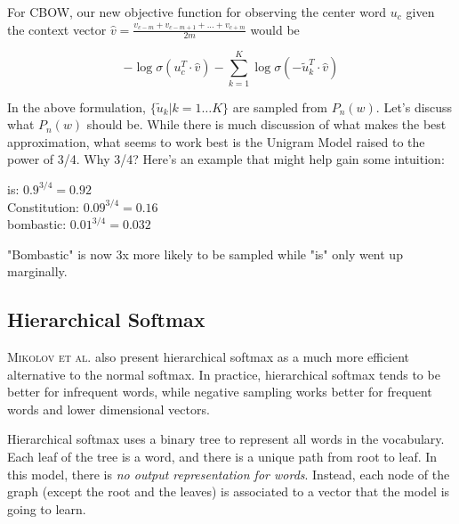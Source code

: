 \documentclass[nobib]{tufte-handout}
\begin{document}
$$ $$ 

For CBOW, our new objective function for observing the center word $ u_c $ given the context vector $\hat{v} = \frac{v_{c-m}+v_{c-m+1}+... + v_{c+m}}{2m} $ would be

$$ - \log \sigma (u_{c}^{T}\cdot \hat{v}) -\sum_{k = 1}^K \log \sigma (- \tilde{u}_{k}^{T}\cdot \hat{v}) $$

In the above formulation, $\{\tilde{u}_{k} | k = 1\hdots K\}$ are sampled from $P_n(w)$. Let's discuss what $P_n(w)$ should be. While there is much discussion of what makes the best approximation, what seems to work best is the Unigram Model raised to the power of 3/4. Why 3/4? Here's an example that might help gain some intuition:\\
\begin{center}
is: $0.9^{3/4} = 0.92$\\
Constitution: $0.09^{3/4} = 0.16$\\
bombastic: $0.01^{3/4} = 0.032$\\
\end{center}

"Bombastic" is now 3x more likely to be sampled while "is" only went up marginally.


\subsection{Hierarchical Softmax}

\textsc{Mikolov et al.} also present hierarchical softmax as a much more efficient alternative to the normal softmax. In practice, hierarchical softmax tends to be better for infrequent words, while negative sampling works better for frequent words and lower dimensional vectors. 

Hierarchical softmax uses a binary tree to represent all words in the vocabulary. Each leaf of the tree is a word, and there is a unique path from root to leaf. In this model, there is \emph{no output representation for words}. Instead, each node of the graph (except the root and the leaves) is associated to a vector that the model is going to learn.
\end{document}
